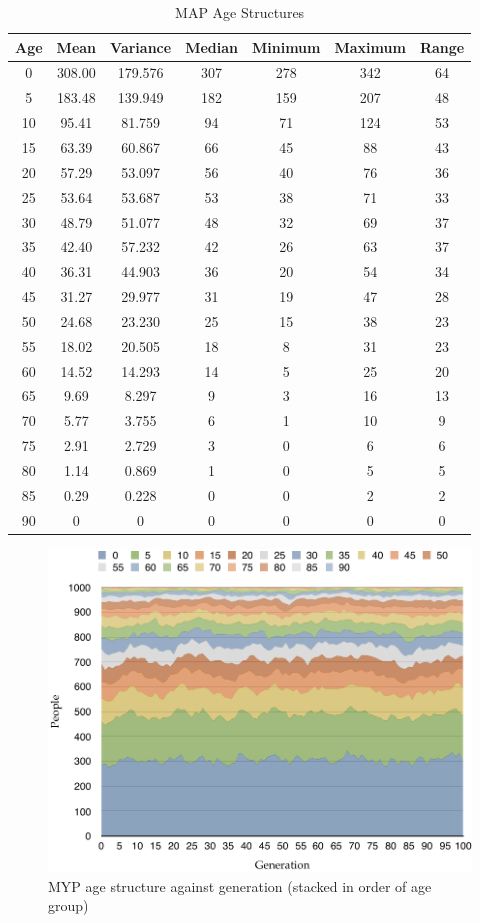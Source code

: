 \documentclass[authoryearcitations]{UoYCSproject}
\begin{document}
\begin{table}[h]
\caption{MAP Age Structures}
\label{tbl:mypAge}
\begin{tabular}{c c c c c c c}
\textbf{Age} & \textbf{Mean} & \textbf{Variance} & \textbf{Median} & \textbf{Minimum} & \textbf{Maximum} & \textbf{Range} \\\hline
0 & 308.00 & 179.576 & 307 & 278 & 342 & 64 \\\hline
5 & 183.48 & 139.949 & 182 & 159 & 207 & 48 \\\hline
10 & 95.41 & 81.759 & 94 & 71 & 124 & 53 \\\hline
15 & 63.39 & 60.867 & 66 & 45 & 88 & 43 \\\hline
20 & 57.29 & 53.097 & 56 & 40 & 76 & 36 \\\hline
25 & 53.64 & 53.687 & 53 & 38 & 71 & 33 \\\hline
30 & 48.79 & 51.077 & 48 & 32 & 69 & 37 \\\hline
35 & 42.40 & 57.232 & 42 & 26 & 63 & 37 \\\hline
40 & 36.31 & 44.903 & 36 & 20 & 54 & 34 \\\hline
45 & 31.27 & 29.977 & 31 & 19 & 47 & 28 \\\hline
50 & 24.68 & 23.230 & 25 & 15 & 38 & 23 \\\hline
55 & 18.02 & 20.505 & 18 & 8 & 31 & 23 \\\hline
60 & 14.52 & 14.293 & 14 & 5 & 25 & 20 \\\hline
65 & 9.69 & 8.297 & 9 & 3 & 16 & 13 \\\hline
70 & 5.77 & 3.755 & 6 & 1 & 10 & 9 \\\hline
75 & 2.91 & 2.729 & 3 & 0 & 6 & 6 \\\hline
80 & 1.14 & 0.869 & 1 & 0 & 5 & 5 \\\hline
85 & 0.29 & 0.228 & 0 & 0 & 2 & 2 \\\hline
90 & 0 & 0 & 0 & 0 & 0 & 0
\end{tabular}
\end{table}

\begin{figure}[h]
\includegraphics[scale=0.6]{myp_age_data}
\caption{MYP age structure against generation (stacked in order of age group)}
\label{fig:mypResultsGraph}
\end{figure}
\end{document}
